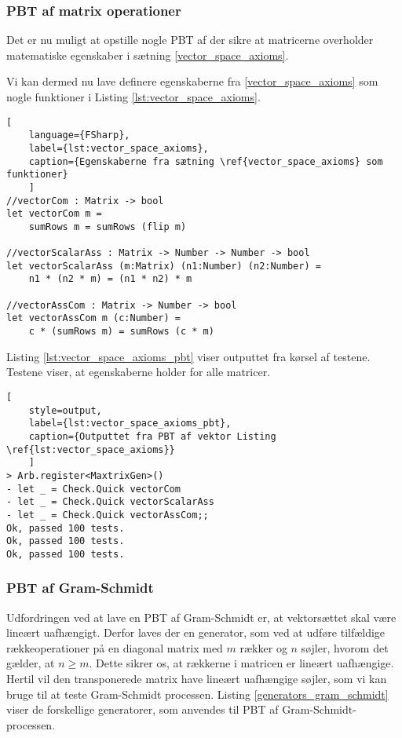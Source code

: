 \subsubsection{PBT af matrix operationer}
Det er nu muligt at opstille nogle PBT af der sikre at matricerne overholder matematiske egenskaber i sætning \ref{vector_space_axioms}. 




Vi kan dermed nu lave definere egenskaberne fra \ref{vector_space_axioms} som nogle funktioner i Listing \ref{lst:vector_space_axioms}.

\begin{lstlisting}[
    language={FSharp}, 
    label={lst:vector_space_axioms}, 
    caption={Egenskaberne fra sætning \ref{vector_space_axioms} som funktioner}
    ]
//vectorCom : Matrix -> bool
let vectorCom m =
    sumRows m = sumRows (flip m)

//vectorScalarAss : Matrix -> Number -> Number -> bool
let vectorScalarAss (m:Matrix) (n1:Number) (n2:Number) =
    n1 * (n2 * m) = (n1 * n2) * m

//vectorAssCom : Matrix -> Number -> bool
let vectorAssCom m (c:Number) =
    c * (sumRows m) = sumRows (c * m)
\end{lstlisting}

Listing \ref{lst:vector_space_axioms_pbt} viser outputtet fra kørsel af testene. Testene viser, at egenskaberne holder for alle matricer.

\begin{lstlisting}[
    style=output, 
    label={lst:vector_space_axioms_pbt}, 
    caption={Outputtet fra PBT af vektor Listing \ref{lst:vector_space_axioms}}
    ]
> Arb.register<MaxtrixGen>()
- let _ = Check.Quick vectorCom
- let _ = Check.Quick vectorScalarAss
- let _ = Check.Quick vectorAssCom;;
Ok, passed 100 tests.
Ok, passed 100 tests.
Ok, passed 100 tests.
\end{lstlisting}

\subsubsection{PBT af Gram-Schmidt}\label{sec:pbt_gram_schmidt}
Udfordringen ved at lave en PBT af Gram-Schmidt er, at vektorsættet skal være lineært uafhængigt. Derfor laves der en generator, som ved at udføre tilfældige rækkeoperationer på en diagonal matrix med \( m \) rækker og \( n \) søjler, hvorom det gælder, at \( n \geq m \). Dette sikrer os, at rækkerne i matricen er lineært uafhængige. Hertil vil den transponerede matrix have lineært uafhængige søjler, som vi kan bruge til at teste Gram-Schmidt processen. Listing \ref{generators_gram_schmidt} viser de forskellige generatorer, som anvendes til PBT af Gram-Schmidt-processen.

